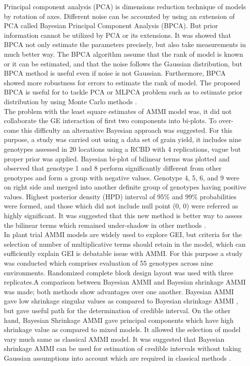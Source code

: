 Principal component analysis (PCA) is dimensions reduction technique of models by rotation of axes. Different noise can be accounted by using an extension of PCA called Bayesian Principal Component Analysis (BPCA). But prior information cannot be utilized by PCA or its extensions. It was showed that BPCA not only estimate the parameters precisely, but also take measurements in much better way. The BPCA algorithm assume that the rank of model is known or it can be estimated, and that the noise follows the Gaussian distribution, but BPCA method is useful even if noise is not Gaussian. Furthermore, BPCA showed more robustness for errors to estimate the rank of model. The proposed BPCA is useful for to tackle PCA or MLPCA problem such as to estimate prior distribution by using Monte Carlo methods \citep{Nounou2002}.\\ 

 The problem with the least square estimates of AMMI model was, it did not collaborate the GE interaction of first two components into bi-plots. To over-come this difficulty an alternative Bayesian approach was suggested. For this purpose, a study was carried out using a data set of grain yield, it includes nine genotypes assessed in 20 locations using a RCBD with 4 replications, vague but proper prior was applied. Bayesian bi-plot of bilinear terms was plotted and observed that genotype 1 and 8 perform significantly different from other genotypes and form a group with negative values. Genotype 4, 5, 6, and 9 were on right side and merged into another definite group of genotypes having positive values. Highest posterior density (HPD) interval of 95\% and 99\% probabilities were formed, and those which did not include null point (0, 0) were referred as highly significant. It was suggested that this new method is better  way to assess the bilinear terms which remained under-shadow in other methods \citep{Crossa2011}. \\
 

  In plant trial AMMI models are widely used to explore GEI, but criteria for the selection of number of multiplicative terms should retain in the model, which can sufficiently explain GEI is debatable issue with AMMI. For this purpose a study was conducted which comprises evaluation of 55 genotypes across nine environments. Randomized complete block design layout was used with three replicates.A comparison between Bayesian AMMI and Bayesian shrinkage AMMI was made; both methods show advantages over one another. Bayesian AMMI gave low shrinkage singular values as compared to Bayesian shrinkage AMMI , but gave useful path for the determination of credible interval. On the other hand, Bayesian Shrinkage AMMI gave principal components which have high shrinkage value as compared to mixed models. It allowed the selection of model vary much same as classical AMMI model. It was suggested that Bayesian shrinkage AMMI can be used for estimation of credible intervals without taking  Gaussian assumptions into account which are required in classical methods \citep{Silva2015}.\\ 
  
